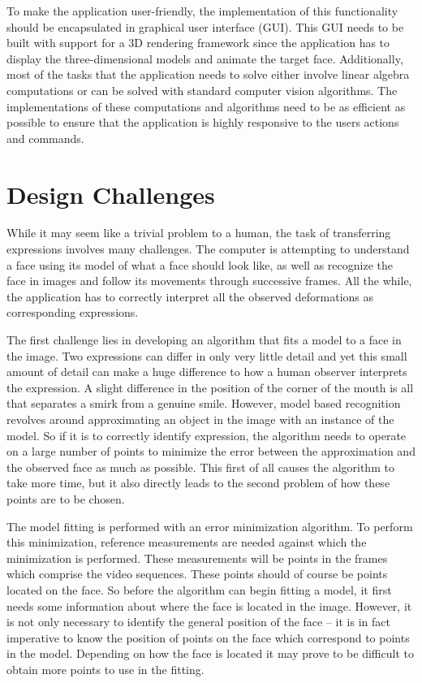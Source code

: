 \documentclass[11pt,a4paper]{report}
\begin{document}
To make the application user-friendly, the implementation of this functionality should be encapsulated in
graphical user interface (GUI). This GUI needs to be built with support for a 3D
rendering framework since the application has to display the three-dimensional models and animate
the target face. Additionally, most of the tasks that the application needs to
solve either involve linear algebra computations or can be solved with standard
computer vision algorithms. The implementations of these computations and
algorithms need to be as efficient as possible to ensure that the application is
highly responsive to the users actions and commands.

\section{Design Challenges}
While it may seem like a trivial problem to a human, the task of transferring expressions involves many
challenges. The computer is attempting to understand a face using its model of
what a face should look like, as well as recognize the face in images and follow
its movements through successive frames. All the while, the application has to 
correctly interpret all the observed deformations as corresponding expressions.  

The first challenge lies in developing an algorithm that fits a model to a face in
the image. Two expressions can differ in only very little detail and yet this
small amount of detail can make a huge difference to how a human observer
interprets the expression. A slight difference in the position of the corner of
the mouth is all that separates a smirk from a genuine smile. However, model based
recognition revolves around approximating an object in the image with an
instance of the model. So if it is to correctly identify expression, the
algorithm needs to operate on a large
number of points to minimize the error between the approximation and the
observed face as much as possible. This first of all causes the algorithm to take
more time, but it also directly leads to the second problem of how these points
are to be chosen. 

The model fitting is performed with an error minimization algorithm. To perform
this minimization, reference measurements are needed against which the minimization is
performed. These measurements will be points in the frames which comprise the
video sequences. These points should of course be points located on the
face. So before the algorithm can begin fitting a model, it first needs some
information about where the face is located in the image. However, it is not
only necessary to identify the general position of the face -- it is in fact
imperative to know the position of points on the face which correspond to points in the
model. Depending on how the face is located it may prove to be difficult to
obtain more points to use in the fitting.
\end{document}
